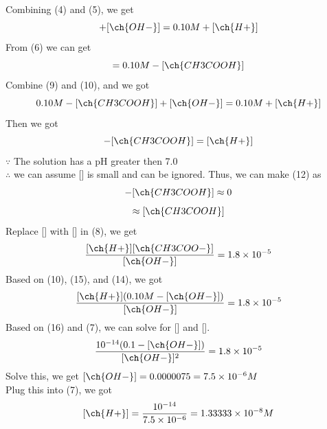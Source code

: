 \documentclass{article}
\begin{document}
\begin{large}
Combining (4) and (5), we get
\begin{equation}
[\ch{CH3COO-}] + [\ch{OH-}] = 0.10M + [\ch{H+}]
\end{equation}
From (6) we can get 
\begin{equation}
[\ch{CH3COO-}] = 0.10M - [\ch{CH3COOH}]
\end{equation}
Combine (9) and (10), and we got
\begin{equation}
    0.10M - [\ch{CH3COOH}] + [\ch{OH-}] = 0.10M + [\ch{H+}]
\end{equation}
Then we got
\begin{equation}
     [\ch{OH-}] - [\ch{CH3COOH}] = [\ch{H+}]
\end{equation}
$\because$ The solution has a pH greater then 7.0\\$\therefore$ we can assume [] is small and can be ignored. 
Thus, we can make (12) as
\begin{equation}
    [\ch{OH-}] - [\ch{CH3COOH}] \approx 0
\end{equation}
\begin{equation}
    [\ch{OH-}] \approx [\ch{CH3COOH}]
\end{equation}
Replace [] with [] in (8), we get
\begin{equation}
\frac{[\ch{H+}][\ch{CH3COO-}]}{[\ch{OH-}]}  = 1.8 \times 10^{-5}    
\end{equation}
Based on (10), (15), and (14), we got
\begin{equation}
\frac{[\ch{H+}](0.10M-[\ch{OH-}])}{[\ch{OH-}]}  = 1.8 \times 10^{-5}    
\end{equation}
Based on (16) and (7), we can solve for [] and [].
\begin{equation}
\frac{
    10^{-14} (0.1-[\ch{OH-}])
}{
[\ch{OH-}]^2
} = 1.8 \times 10^{-5}
\end{equation}
Solve this, we get $[\ch{OH-}] = 0.0000075 = 7.5 \times 10^{-6}M$\\
Plug this into (7), we got $$[\ch{H+}] = \frac{10^{-14}}{7.5 \times 10^{-6}} = 1.33333 \times 10^{-8}M$$\\

\end{large}
\end{document}
